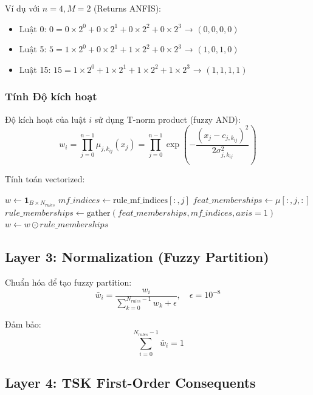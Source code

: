 \documentclass[12pt,a4paper]{article}
\begin{document}
Ví dụ với $n=4, M=2$ (Returns ANFIS):
\begin{itemize}
    \item Luật 0: $0 = 0 \times 2^0 + 0 \times 2^1 + 0 \times 2^2 + 0 \times 2^3$ → $(0,0,0,0)$
    \item Luật 5: $5 = 1 \times 2^0 + 0 \times 2^1 + 1 \times 2^2 + 0 \times 2^3$ → $(1,0,1,0)$
    \item Luật 15: $15 = 1 \times 2^0 + 1 \times 2^1 + 1 \times 2^2 + 1 \times 2^3$ → $(1,1,1,1)$
\end{itemize}

\subsubsection{Tính Độ kích hoạt}

Độ kích hoạt của luật $i$ sử dụng T-norm product (fuzzy AND):
\begin{equation}
w_i = \prod_{j=0}^{n-1} \mu_{j,k_{ij}}(x_j) = \prod_{j=0}^{n-1} \exp\left(-\frac{(x_j - c_{j,k_{ij}})^2}{2\sigma_{j,k_{ij}}^2}\right)
\end{equation}

Tính toán vectorized:
\begin{algorithmic}
\State $w \gets \mathbf{1}_{B \times N_{rules}}$ 
    \State $mf\_indices \gets \text{rule\_mf\_indices}[:, j]$ 
    \State $feat\_memberships \gets \mu[:, j, :]$ 
    \State $rule\_memberships \gets \text{gather}(feat\_memberships, mf\_indices, axis=1)$ 
    \State $w \gets w \odot rule\_memberships$ 
\EndFor
\end{algorithmic}

\subsection{Layer 3: Normalization (Fuzzy Partition)}

Chuẩn hóa để tạo fuzzy partition:
\begin{equation}
\bar{w}_i = \frac{w_i}{\sum_{k=0}^{N_{rules}-1} w_k + \epsilon}, \quad \epsilon = 10^{-8}
\end{equation}

Đảm bảo:
\begin{equation}
\sum_{i=0}^{N_{rules}-1} \bar{w}_i = 1
\end{equation}

\subsection{Layer 4: TSK First-Order Consequents}
\end{document}

